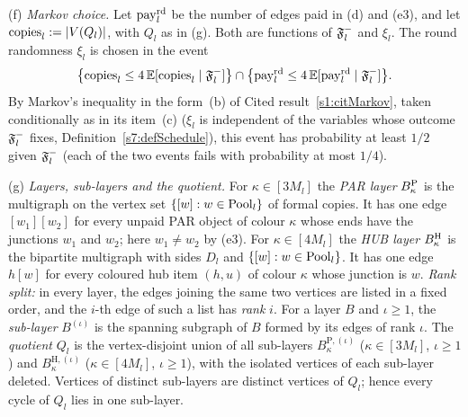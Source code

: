 \begin{construction}
\smallskip\noindent
(f) \emph{Markov choice.} Let $\mathrm{pay}^{\mathrm{rd}}_l$ be the number of edges paid in (d) and
(e3), and let $\mathrm{copies}_l\mathrel{:=}|V(Q_l)|$, with $Q_l$ as in (g). Both are
functions of $\mathfrak{F}^{-}_l$ and $\xi_l$. The round randomness $\xi_l$ is chosen in the
event
\[
\bigl\{\mathrm{copies}_l\le4\,\mathbb{E}[\mathrm{copies}_l\mid\mathfrak{F}^{-}_l]\bigr\}\cap
\bigl\{\mathrm{pay}^{\mathrm{rd}}_l\le4\,\mathbb{E}[\mathrm{pay}^{\mathrm{rd}}_l\mid\mathfrak{F}^{-}_l]\bigr\}.
\]
By Markov's inequality in the form~(b) of Cited result~\ref{s1:citMarkov},
taken conditionally as in its item~(c) ($\xi_l$ is independent of the variables
whose outcome $\mathfrak{F}^{-}_l$ fixes, Definition~\ref{s7:defSchedule}), this event has
probability at least $1/2$ given $\mathfrak{F}^{-}_l$ (each of the two events fails with
probability at most $1/4$).

\smallskip\noindent
(g) \emph{Layers, sub-layers and the quotient.} For $\kappa\in[3M_l]$ the
\emph{PAR layer} $B^{\mathrm{P}}_\kappa$ is the multigraph on the vertex set
$\{[w]:w\in\mathrm{Pool}_l\}$ of formal copies. It has one edge $[w_1][w_2]$ for every
unpaid PAR object of colour $\kappa$ whose ends have the junctions $w_1$ and
$w_2$; here $w_1\ne w_2$ by (e3). For $\kappa\in[4M_l]$ the \emph{HUB layer}
$B^{\mathrm{H}}_\kappa$ is the bipartite multigraph with sides $D_l$ and
$\{[w]:w\in\mathrm{Pool}_l\}$. It has one edge $h[w]$ for every coloured hub item $(h,u)$
of colour $\kappa$ whose junction is $w$. \emph{Rank split:} in every layer, the
edges joining the same two vertices are listed in a fixed order, and the $i$-th
edge of such a list has \emph{rank} $i$. For a layer $B$ and $\iota\ge1$, the
\emph{sub-layer} $B^{(\iota)}$ is the spanning subgraph of $B$ formed by its edges
of rank $\iota$. The \emph{quotient} $Q_l$ is the vertex-disjoint union of all
sub-layers $B^{\mathrm{P},(\iota)}_\kappa$ ($\kappa\in[3M_l]$, $\iota\ge1$) and
$B^{\mathrm{H},(\iota)}_\kappa$ ($\kappa\in[4M_l]$, $\iota\ge1$), with the
isolated vertices of each sub-layer deleted. Vertices of distinct sub-layers are
distinct vertices of $Q_l$; hence every cycle of $Q_l$ lies in one sub-layer.


\end{construction}
